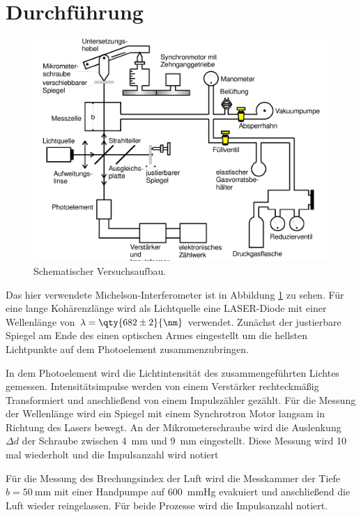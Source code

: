 \section{Durchführung}
\begin{figure}
    \includegraphics[width=\textwidth]{Abbildungen/Screenshot (5).png}
    \caption{Schematischer Versuchsaufbau.}
    \label{fig:Aufbau}
\end{figure}
Das hier verwendete Michelson-Interferometer ist in Abbildung \ref{fig:Aufbau} zu sehen.
Für eine lange Kohärenzlänge wird als Lichtquelle eine LASER-Diode mit einer Wellenlänge von $\lambda =\qty{682 \pm 2}{\nm}$ verwendet. 
Zunächst der justierbare Spiegel am Ende des einen optischen Armes eingestellt um die hellsten Lichtpunkte auf dem Photoelement zusammenzubringen.

In dem Photoelement wird die Lichtintensität des zusammengeführten Lichtes gemessen.
Intensitätsimpulse werden von einem Verstärker rechteckmäßig Transformiert und anschließend von einem Impulszähler gezählt.
Für die Messung der Wellenlänge wird ein Spiegel mit einem Synchrotron Motor langsam in Richtung des Lasers bewegt.
An der Mikrometerschraube wird die Auslenkung $\Delta d$ der Schraube zwischen \qty{4}{\mm} und \qty{9}{\mm} eingestellt.
Diese Messung wird 10 mal wiederholt und die Impulsanzahl wird notiert

Für die Messung des Brechungsindex der Luft wird die Messkammer der Tiefe $b = \qty{50}{\mm}$ mit einer Handpumpe auf \qty{600}{\mmHg} evakuiert 
und anschließend die Luft wieder reingelassen. Für beide Prozesse wird die Impulsanzahl notiert.